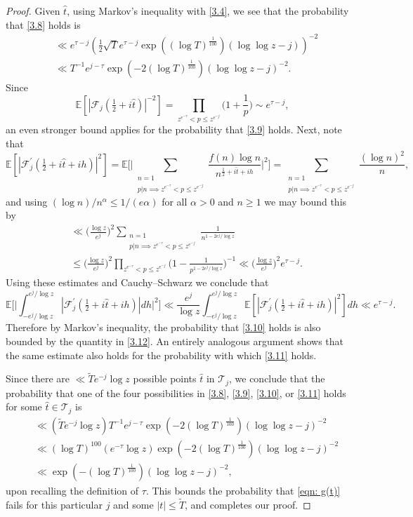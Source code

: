 \documentclass[10pt,a4paper]{amsart}
\def\E{\mathbb E}
\def\TT{\widetilde{T}}
\begin{document}
\begin{proof}
Given ${\widehat t}$, using Markov's inequality with \eqref{3.4}, we see that the probability that \eqref{3.8} holds is
\begin{align} 
\label{3.12} 
&\ll e^{\tau-j} (\tfrac 12 \sqrt{T} e^{\tau-j} \exp((\log T)^{\frac 1{100}}) (\log \log z - j))^{-2} \nonumber\\
& \ll T^{-1} e^{j-\tau} \exp(-2(\log T)^{\frac 1{100}}) (\log \log z - j)^{-2}.
\end{align} 
Since 
$$
\E[|{\mathcal F}_j(\tfrac 12+i {\widehat t})|^{-2}] = \prod_{z^{e^{-\tau}} < p \le z^{e^{-j}}} \Big(1 +\frac 1p \Big) \sim e^{\tau -j}, 
$$ 
an even stronger bound applies for the probability that \eqref{3.9} holds.   Next, note that 
$$ 
\E[ |{\mathcal F}_j^{\prime}(\tfrac 12 +i{\widehat t} +ih)|^2 ] = \E\Big[ \Big| \sum_{\substack{ n=1 \\ p|n \implies z^{e^{-\tau}}<p\le z^{e^{-j}}}} \frac{f(n) \log n}{n^{\frac 12+i {\widehat t}+ih}}\Big|^2\Big] = \sum_{\substack{ n=1 \\ p|n \implies z^{e^{-\tau}}<p\le z^{e^{-j}}}} \frac{(\log n)^2}{n},  
$$ 
and using $(\log n)/n^{\alpha} \le 1/(e\alpha)$ for all $\alpha>0$ and $n\ge 1$ we may bound this by 
\begin{align*} 
&\ll \Big( \frac{\log z}{e^j} \Big)^2 \sum_{\substack{ n=1 \\ p|n \implies z^{e^{-\tau}}<p\le z^{e^{-j}}}} \frac{1}{n^{1-2 e^{j}/\log z}} 
\\
&\le \Big( \frac{\log z}{e^j} \Big)^2  \prod_{z^{e^{-\tau}}<p\le z^{e^{-j}}} \Big(1- \frac 1{p^{1-2e^{j}/\log z}}\Big)^{-1} \ll \Big( \frac{\log z}{e^j} \Big)^2 e^{\tau-j}. 
\end{align*} 
Using these estimates and Cauchy--Schwarz we conclude that 
$$ 
\E \Big[ \Big| \int_{-e^{j}/\log z}^{e^{j}/\log z} |{\mathcal F}_j^{\prime}(\tfrac 12+i{\widehat t} +ih)| dh \Big|^2 \Big] 
\ll \frac{e^{j}}{\log z} \int_{-e^{j}/\log z}^{e^{j}/\log z}  \E[ |{\mathcal F}_j^{\prime}(\tfrac 12 +i{\widehat t} +ih)|^2 ]  dh \ll e^{\tau- j}. 
$$ 
Therefore by Markov's inequality, the probability that \eqref{3.10} holds is also bounded by the quantity in \eqref{3.12}.   An entirely analogous argument shows that the same estimate also holds for the probability with which \eqref{3.11} holds.   

Since there are $\ll {\widetilde T}e^{-j} \log z$ possible points ${\widehat t}$ in ${\mathcal T}_j$, we conclude that the probability that one of the four possibilities in \eqref{3.8}, 
\eqref{3.9},  \eqref{3.10}, or \eqref{3.11} holds for some ${\widehat t} \in {\mathcal T}_j$ is 
\begin{align*}
&\ll ({\widetilde T} e^{-j} \log z) T^{-1} e^{j-\tau} \exp(-2(\log T)^{\frac 1{100}}) (\log \log z - j)^{-2}\\
& \ll (\log T)^{100} (e^{-\tau} \log z) \exp(-2(\log T)^{\frac 1{100}}) (\log \log z - j)^{-2} \\
&\ll \exp(-(\log T)^{\frac 1{100}}) (\log \log z - j)^{-2}, 
\end{align*}
upon recalling the definition of $\tau$.   This bounds the probability that \eqref{eqn: g(t)} fails for this particular $j$ and some $|t| \le \TT$, and completes our proof. 
 \end{proof} 
\end{document}
